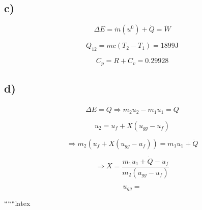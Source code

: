 \subsection*{c)}

\begin{equation*}
\Delta E = \dot{m} (u^0) + \dot{Q} = \dot{W}
\end{equation*}

\begin{equation*}
Q_{12} = m c (T_2 - T_1) = 1899 \text{J}
\end{equation*}

\begin{equation*}
C_p = R + C_v = 0.29928
\end{equation*}

\subsection*{d)}

\begin{equation*}
\Delta E = \dot{Q} \Rightarrow m_2 u_2 - m_1 u_1 = \dot{Q}
\end{equation*}

\begin{equation*}
u_2 = u_f + X (u_{gg} - u_f)
\end{equation*}

\begin{equation*}
\Rightarrow m_2 (u_f + X (u_{gg} - u_f)) = m_1 u_1 + \dot{Q}
\end{equation*}

\begin{equation*}
\Rightarrow X = \frac{m_1 u_1 + \dot{Q} - u_f}{m_2 (u_{gg} - u_f)}
\end{equation*}

\begin{equation*}
u_{gg} =
\end{equation*}

``````latex


